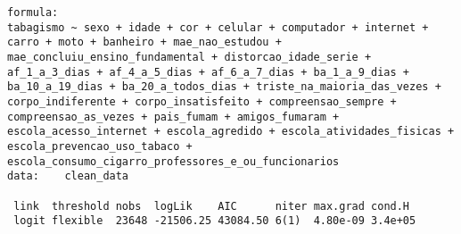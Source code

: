 \documentclass[
]{article}
\begin{document}
\begin{verbatim}
formula: 
tabagismo ~ sexo + idade + cor + celular + computador + internet + carro + moto + banheiro + mae_nao_estudou + mae_concluiu_ensino_fundamental + distorcao_idade_serie + af_1_a_3_dias + af_4_a_5_dias + af_6_a_7_dias + ba_1_a_9_dias + ba_10_a_19_dias + ba_20_a_todos_dias + triste_na_maioria_das_vezes + corpo_indiferente + corpo_insatisfeito + compreensao_sempre + compreensao_as_vezes + pais_fumam + amigos_fumaram + escola_acesso_internet + escola_agredido + escola_atividades_fisicas + escola_prevencao_uso_tabaco +      escola_consumo_cigarro_professores_e_ou_funcionarios
data:    clean_data

 link  threshold nobs  logLik    AIC      niter max.grad cond.H 
 logit flexible  23648 -21506.25 43084.50 6(1)  4.80e-09 3.4e+05


\end{verbatim}
\end{document}
